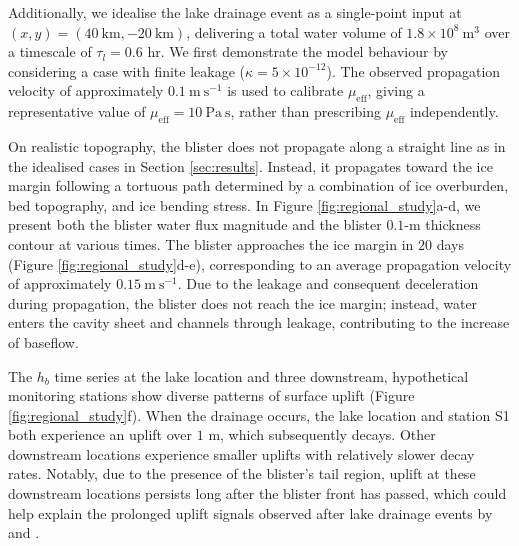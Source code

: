 \documentclass[draft]{agujournal2019}
\newcommand{\secref}[1]{Section \ref{#1}}
\newcommand{\figref}[1]{Figure \ref{#1}}
\begin{document}
Additionally, we idealise the lake drainage event as a single-point input at $(x,y)=(40~\text{km},-20~\text{km})$, delivering a total water volume of $1.8\times10^{8}~\text{m}^3$ over a timescale of $\tau_l=0.6$ hr. We first demonstrate the model behaviour by considering a case with finite leakage ($\kappa=5\times10^{-12}$). The observed propagation velocity of approximately \(0.1~\mathrm{m~s^{-1}}\) is used to calibrate \(\mu_{\mathrm{eff}}\), giving a representative value of \(\mu_{\mathrm{eff}}=10~\mathrm{Pa~s}\), rather than prescribing \(\mu_{\mathrm{eff}}\) independently.

On realistic topography, the blister does not propagate along a straight line as in the idealised cases in \secref{sec:results}. Instead, it propagates toward the ice margin following a tortuous path determined by a combination of ice overburden, bed topography, and ice bending stress. In \figref{fig:regional_study}a-d, we present both the blister water flux magnitude and the blister $0.1$-m thickness contour at various times. The blister approaches the ice margin in $20$ days (\figref{fig:regional_study}d-e), corresponding to an average propagation velocity of approximately $0.15~\text{m}~\text{s}^{-1}$. Due to the leakage and consequent deceleration during propagation, the blister does not reach the ice margin; instead, water enters the cavity sheet and channels through leakage, contributing to the increase of baseflow.

The $h_b$ time series at the lake location and three downstream, hypothetical monitoring stations show diverse patterns of surface uplift (\figref{fig:regional_study}f). When the drainage occurs, the lake location and station S1 both experience an uplift over $1$ m, which subsequently decays. Other downstream locations experience smaller uplifts with relatively slower decay rates. Notably, due to the presence of the blister's tail region, uplift at these downstream locations persists long after the blister front has passed, which could help explain the prolonged uplift signals observed after lake drainage events by  and . 

\end{document}
